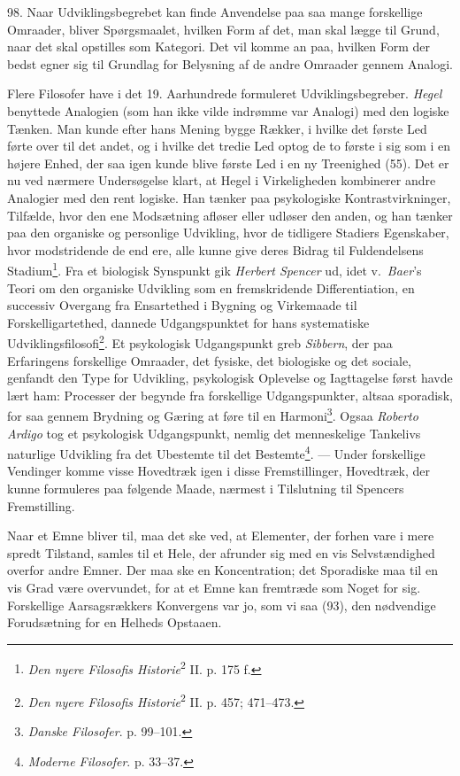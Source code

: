 \documentclass[12pt,a4paper]{book}
\newcommand{\apage}[1]{\marginnote{\footnotesize\textit{[#1]}}}
\begin{document}
98. Naar Udviklingsbegrebet kan finde Anvendelse paa saa mange forskellige
Omraader, bliver Spørgsmaalet, hvilken Form af det, man skal lægge til Grund, naar
det skal opstilles som Kategori. Det vil komme an paa, hvilken Form der bedst
egner sig til Grundlag for Belysning af de andre Omraader gennem Analogi.

Flere Filosofer have i det 19. Aarhundrede formuleret Udviklingsbegreber.
\emph{Hegel} benyttede Analogien (som han ikke vilde indrømme var Analogi) med den
logiske Tænken. Man kunde efter hans Mening bygge Rækker, i hvilke det første Led
førte over til det andet, og i hvilke det tredie Led optog de to første i sig som
i en højere Enhed, der saa igen kunde blive første Led i en ny Treenighed (55).
Det er nu ved nærmere Undersøgelse klart, at Hegel i Virkeligheden kombinerer
andre Analogier med den rent logiske. Han tænker paa psykologiske
Kontrastvirkninger, Tilfælde, hvor den ene Modsætning afløser eller udløser den
anden, og han tænker paa den organiske og personlige Udvikling, hvor de tidligere
Stadiers Egenskaber, hvor modstridende de end ere, alle kunne give deres Bidrag
til Fuldendelsens Stadium\footnote{\emph{Den nyere Filosofis
Historie}\textsuperscript{2} II. p. 175 f.}. Fra et biologisk Synspunkt gik
\emph{Herbert Spencer} ud, idet v.\ \emph{Baer}'s Teori om den organiske Udvikling
som en fremskridende Differentiation, en successiv Overgang fra Ensartethed i
Bygning og Virkemaade til Forskelligartethed, dannede Udgangspunktet for hans
systematiske Udviklingsfilosofi\footnote{\emph{Den nyere Filosofis
Historie}\textsuperscript{2} II. p. 457; 471--473.}. Et psykologisk Udgangspunkt
greb \emph{Sibbern}, der paa Erfaringens forskellige Omraader, det fysiske, det
biologiske og det sociale, genfandt den Type for Udvikling, psykologisk Oplevelse
og Iagttagelse først havde lært ham: Processer der begynde fra forskellige
Udgangspunkter, altsaa sporadisk, for saa gennem Brydning og Gæring at føre til en
Harmoni\footnote{\emph{Danske Filosofer}. p. 99--101.}. Ogsaa \emph{Roberto
Ardigo} tog et psykologisk Udgangspunkt, nemlig det \apage{233} menneskelige Tankelivs
naturlige Udvikling fra det Ubestemte til det Bestemte\footnote{\emph{Moderne
Filosofer}. p. 33--37.}. --- Under forskellige Vendinger komme visse Hovedtræk
igen i disse Fremstillinger, Hovedtræk, der kunne formuleres paa følgende Maade,
nærmest i Tilslutning til Spencers Fremstilling.

Naar et Emne bliver til, maa det ske ved, at Elementer, der forhen vare i mere
spredt Tilstand, samles til et Hele, der afrunder sig med en vis Selvstændighed
overfor andre Emner. Der maa ske en Koncentration; det Sporadiske maa til en vis
Grad være overvundet, for at et Emne kan fremtræde som Noget for sig. Forskellige
Aarsagsrækkers Konvergens var jo, som vi saa (93), den nødvendige Forudsætning for
en Helheds Opstaaen.
\end{document}
